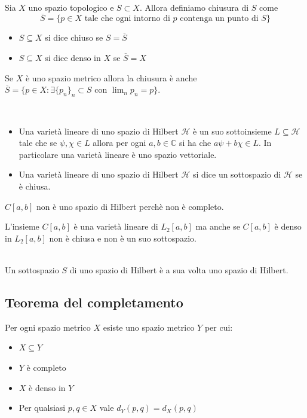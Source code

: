 \documentclass[11pt,a4paper,twoside]{book}
\newenvironment{proposizione}[1][\empty]{\begin{Proposizione}{
\ifx\empty#1\relax\else\mdseries\itshape#1\\\fi
}{}}{\end{Proposizione}}
\newenvironment{definizione}[1][\empty]{\begin{Definizione}{
\ifx\empty#1\relax\else\mdseries\itshape#1\\\fi
}{}}{\end{Definizione}}
\newenvironment{esempio}[1][Esempio]{ 
  \begin{center}\begin{tcolorbox}[
  title={#1:~},
  width=0.9\linewidth,
  flush right,
  enhanced jigsaw, 
  colback=white, 
  frame hidden, 
  sharpish corners, arc=3mm,
  borderline west = {1pt}{0pt}{gray},
  borderline south = {1pt}{0pt}{gray},
  coltitle=black, 
  fonttitle=\small\bfseries, 
  attach title to upper, 
  breakable,
  top=2.5pt, bottom=0.3pt]\small
  }{
 \normalsize \end{tcolorbox}\end{center}
}
\theoremstyle{esss}
\theoremstyle{dotless}
\numberwithin{equation}{section} %
\begin{document}
\begin{definizione}
Sia $X$ uno spazio topologico e $S\subset X$. Allora definiamo chiusura di $S$ come 
\[
\overline{S}=\{p\in X \text{ tale che ogni intorno di }p\text{ contenga un punto di }S\}
\]
\begin{itemize}[label=$\cdot$]
\item $S\subseteq X$ si dice chiuso se $S=\overline{S}$ 
\item $S\subseteq X$ si dice denso in $X$ se $\overline{S}=X$
\end{itemize}
\end{definizione}

Se $X$ è uno spazio metrico allora la chiusura è anche $\overline{S}=\{p\in X : \exists\{p_n\}_n\subset S \text{ con } \lim_n p_n=p\}$.

\begin{definizione}\begin{itemize}[label=$\cdot$]
\item Una varietà lineare di uno spazio di Hilbert $\mathcal{H}$ è un suo sottoinsieme $L\subseteq \mathcal{H}$ tale che se $\psi,\chi\in L$ allora per ogni $a,b\in\mathbb{C}$ si ha che $a\psi+b\chi\in L$. In particolare una varietà lineare è uno spazio vettoriale.
\item Una varietà lineare di uno spazio di Hilbert $\mathcal{H}$ si dice un sottospazio di $\mathcal{H}$ se è chiusa.
\end{itemize}
\end{definizione}

\begin{esempio} $C[a,b]$ non è uno spazio di Hilbert perchè non è completo.

 L'insieme $C[a,b]$ è una varietà lineare di $L_2[a,b]$ ma anche se $C[a,b]$ è denso in $L_2[a,b]$ non è chiusa e non è un suo sottospazio.

\end{esempio}

\begin{proposizione}Un sottospazio $S$ di uno spazio di Hilbert è a sua volta uno spazio di Hilbert.
\end{proposizione}

\subsection*{Teorema del completamento}

Per ogni spazio metrico $X$ esiste uno spazio metrico $Y$ per cui: \begin{itemize}[label=$\cdot$] \item $X\subseteq Y$ \item $Y$ è completo \item $X$ è denso in $Y$ \item Per qualsiasi $p,q\in X$ vale $d_Y(p,q)=d_X(p,q)$\end{itemize}
\end{document}

